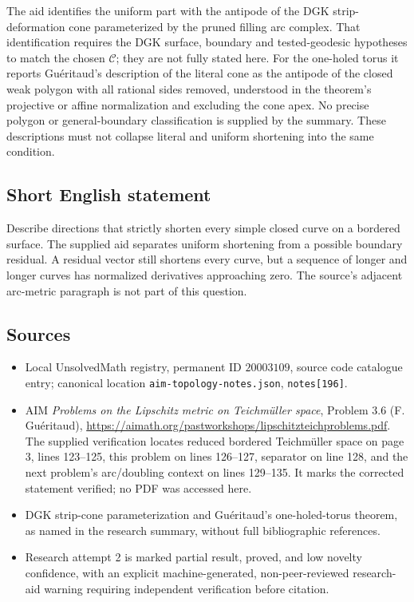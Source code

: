 \documentclass[11pt]{article}
\begin{document}
The aid identifies the uniform part with the antipode of the DGK strip-deformation cone parameterized by the pruned filling arc complex. That identification requires the DGK surface, boundary and tested-geodesic hypotheses to match the chosen $\mathscr C$; they are not fully stated here. For the one-holed torus it reports Gu\'eritaud's description of the literal cone as the antipode of the closed weak polygon with all rational sides removed, understood in the theorem's projective or affine normalization and excluding the cone apex. No precise polygon or general-boundary classification is supplied by the summary. These descriptions must not collapse literal and uniform shortening into the same condition.
\subsection{Short English statement}
Describe directions that strictly shorten every simple closed curve on a bordered surface. The supplied aid separates uniform shortening from a possible boundary residual. A residual vector still shortens every curve, but a sequence of longer and longer curves has normalized derivatives approaching zero. The source's adjacent arc-metric paragraph is not part of this question.
\subsection{Sources}
\begin{itemize}
\item Local UnsolvedMath registry, permanent ID $20003109$, source code catalogue entry; canonical location \texttt{aim-topology-notes.json}, \texttt{notes[196]}.
\item AIM \emph{Problems on the Lipschitz metric on Teichm\"uller space}, Problem 3.6 (F. Gu\'eritaud), \url{https://aimath.org/pastworkshops/lipschitzteichproblems.pdf}. The supplied verification locates reduced bordered Teichm\"uller space on page 3, lines 123--125, this problem on lines 126--127, separator on line 128, and the next problem's arc/doubling context on lines 129--135. It marks the corrected statement verified; no PDF was accessed here.
\item DGK strip-cone parameterization and Gu\'eritaud's one-holed-torus theorem, as named in the research summary, without full bibliographic references.
\item Research attempt 2 is marked partial result, proved, and low novelty confidence, with an explicit machine-generated, non-peer-reviewed research-aid warning requiring independent verification before citation.
\end{itemize}
\end{document}
